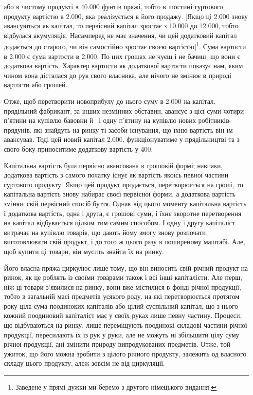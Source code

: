 \parcont{}  %
або в чистому продукті в \num{40.000} фунтів пряжі, тобто в шостині
гуртового продукту вартістю в \num{2.000}, яка
реалізується в його продажу. [Якщо ці \num{2.000}
знову авансуються як капітал, то первісний капітал зростає
з \num{10.000} до \num{12.000}, тобто
відбулася акумуляція. Насамперед не має значення, чи цей додатковий
капітал додається до старого, чи він самостійно зростає
своєю вартістю]\footnote*{
Заведене у прямі дужки ми беремо з другого німецького видання.
}. Сума вартости в \num{2.000} є сума
вартости в \num{2.000}. По цих грошах не чуєш і не
бачиш, що вони є додаткова вартість. Характер вартости як додаткової
вартости показує нам, яким чином вона дісталася до
рук свого власника, але нічого не змінює в природі вартости
або грошей.

Отже, щоб перетворити новоприбулу до нього суму в \num{2.000} на капітал, прядільний фабрикант, за інших незмінних
обставин, авансує з цієї суми чотири п’ятини на купівлю
бавовни й~ і одну п’ятину на купівлю нових робітників-прядунів,
які знайдуть на ринку ті засоби існування, що їхню вартість
він їм авансував. Тоді цей новий капітал \num{2.000}, функціонуватиме у прядільництві та з свого боку
приноситиме додаткову вартість у 400.

Капітальна вартість була первісно авансована в грошовій
формі; навпаки, додаткова вартість з самого початку існує як
вартість якоїсь певної частини гуртового продукту. Якщо цей
продукт продається, перетворюється на гроші, то капітальна
вартість знову набирає своєї первісної форми, а додаткова вартість
змінює свій первісний спосіб буття. Однак від цього моменту
капітальна вартість і додаткова вартість, одна і друга, є грошові
суми, і їхнє зворотне перетворення на капітал відбувається цілком
тим самим способом. І одну і другу капіталіст витрачає на
купівлю товарів, що дають йому змогу знову розпочати виготовлювати
свій продукт, і до того ж цього разу в поширеному
маштабі. Але, щоб купити ці товари, він мусить знайти їх на ринку.

Його власна пряжа циркулює лише тому, що він виносить
свій річний продукт на ринок, як це роблять із своїми товарами
також і всі інші капіталісти. Але перш, ніж ці товари з’явилися
на ринку, вони вже містилися в фонді річної продукції, тобто в
загальній масі предметів усякого роду, на які перетворюється
протягом року ціла сума поодиноких капіталів або цілий суспільний
капітал, що з нього кожний поодинокий капіталіст має
у своїх руках лише певну частину. Процеси, що відбуваються на
ринку, лише переміщують поодинокі складові частини річної
продукції, пересилають їх із рук у руки, але не можуть ні збільшити
цілу суму річної продукції, ані змінити природу випродукованих
предметів. Отже, той ужиток, що його можна зробити
з цілого річного продукту, залежить од власного складу цього
продукту, алеж зовсім не від циркуляції.
